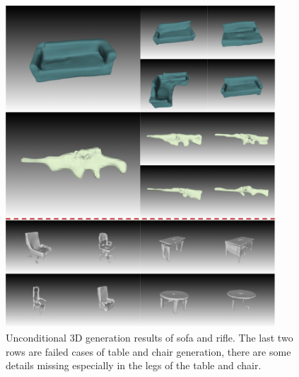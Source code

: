 \documentclass[11pt]{article}
\newcommand\1{\mathds{1}}
\begin{document}
\begin{figure}[htbp]
    \centering
    \includegraphics[width=0.9\textwidth]{imgs/other_and_fail.pdf}
    \caption{Unconditional 3D generation results of sofa and rifle. The last two rows are failed cases of table and chair generation, there are some details missing especially in the legs of the table and chair. }
    \label{fig:sofa_rifle_unconditional} 
\end{figure}
\end{document}
